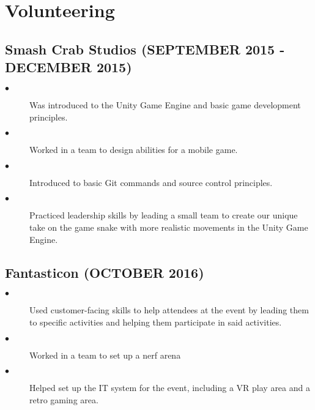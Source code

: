 \documentclass{article}
\begin{document}
\section{Volunteering}
\noindent
\hfill
\begin{minipage}[t]{1\textwidth}
    \subsection{Smash Crab Studios \footnotesize{(SEPTEMBER 2015 - DECEMBER 2015)}}
    \normalsize{}
    \begin{description}
        \item[$\bullet$] Was introduced to the Unity Game Engine and basic game development principles. 
        \item[$\bullet$] Worked in a team to design abilities for a mobile game.  
        \item[$\bullet$] Introduced to basic Git commands and source control principles.
        \item[$\bullet$] Practiced leadership skills by leading a small team to create our unique take on the game snake with more realistic movements in the Unity Game Engine. 
    \end{description}

    \subsection{Fantasticon \footnotesize{(OCTOBER 2016)}}
    \normalsize{}
    \begin{description}
        \item[$\bullet$] Used customer-facing skills to help attendees at the event by leading them to specific activities and helping them participate in said activities. 
        \item[$\bullet$] Worked in a team to set up a nerf arena
        \item[$\bullet$] Helped set up the IT system for the event, including a VR play area and a retro gaming area. 
    \end{description}

\end{minipage}
\end{document}
